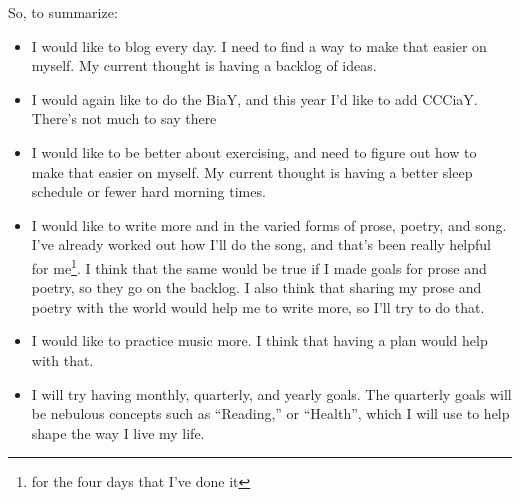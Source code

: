 \documentclass[12pt]{article}[titlepage]
\newcommand{\say}[1]{``#1''}
\newcommand{\1}{\={a}}
\newcommand{\2}{\={e}}
\newcommand{\3}{\={\i}}
\newcommand{\4}{\=o}
\newcommand{\5}{\=u}
\newcommand{\6}{\={A}}
\renewcommand{\,}{\textsuperscript{,}}
\begin{document}
So, to summarize:
\begin{itemize}
\item I would like to blog every day. I need to find a way to make that easier on myself. My current thought is having a backlog of ideas.
\item I would again like to do the BiaY, and this year I'd like to add CCCiaY. There's not much to say there
\item I would like to be better about exercising, and need to figure out how to make that easier on myself. My current thought is having a better sleep schedule or fewer hard morning times.
\item I would like to write more and in the varied forms of prose, poetry, and song.
I've already worked out how I'll do the song, and that's been really helpful for me\footnote{for the four days that I've done it}.
I think that the same would be true if I made goals for prose and poetry, so they go on the backlog.
I also think that sharing my prose and poetry with the world would help me to write more, so I'll try to do that.
\item I would like to practice music more.
I think that having a plan would help with that.
\item I will try having monthly, quarterly, and yearly goals.
The quarterly goals will be nebulous concepts such as \say{Reading,} or \say{Health}, which I will use to help shape the way I live my life.
\end{itemize}
\end{document}
